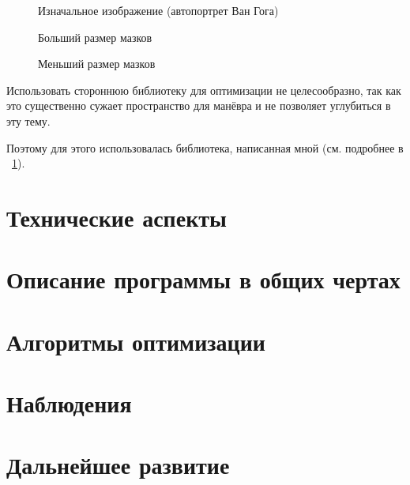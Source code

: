 \documentclass[11pt]{article}
\begin{document}
    \begin{figure}[h!]
        \centering
        \caption{Изначальное изображение (автопортрет Ван Гога)}
        \label{fig:van-gog-original}
    \end{figure}
    \FloatBarrier

    \begin{figure}[h!]
        \centering
        \caption{Больший размер мазков}
        \label{fig:my-van-gog-wide}
    \end{figure}
    \FloatBarrier

    \begin{figure}[h!]
        \centering
        \caption{Меньший размер мазков}
        \label{fig:my-van-gog-thin}
    \end{figure}
    \FloatBarrier


    Использовать стороннюю библиотеку для оптимизации не целесообразно,
    так как это существенно сужает пространство для манёвра и не позволяет
    углубиться в эту тему.

    Поэтому для этого использовалась библиотека, написанная мной (см. подробнее в ~\ref{sec:tecnical}).

    \section{Технические аспекты}\label{sec:tecnical}
    


    \section{Описание программы в общих чертах}\label{sec:general_description}
    


    \section {Алгоритмы оптимизации}\label{sec:opimization_algorithms}
    

    \section{Наблюдения}\label{sec:observations}
    

    \section{Дальнейшее развитие}\label{sec:todo}
    
\end{document}
